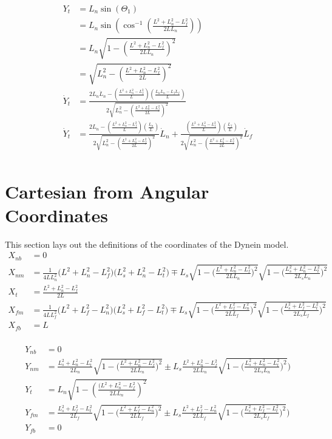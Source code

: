 \documentclass[11pt, landscape]{article}
\begin{document}
\begin{align}
  Y_{t} &= L_n\sin(\Theta_{1}) \\
  &= L_n\sin\left(\cos^{-1}\left(\frac{L^2+L_n^2-L_f^2}{2LL_n}\right)\right) \\
  &= L_n\sqrt{1 - \left(\frac{L^2+L_n^2-L_f^2}{2LL_n}\right)^2} \\
  &= \sqrt{L_n^2 - \left(\frac{L^2+L_n^2-L_f^2}{2L}\right)^2} \\
  \dot{Y}_t &= \frac{2L_n\dot{L}_n - \left(\frac{L^2+L_n^2-L_f^2}{L}\right)\left(\frac{L_n\dot{L}_n - L_f\dot{L}_f}{L}\right)}{2\sqrt{L_n^2 - \left(\frac{L^2+L_n^2-L_f^2}{2L}\right)^2}}\\
  \dot{Y}_t &= \frac{2L_n - \left(\frac{L^2+L_n^2-L_f^2}{L}\right)\left(\frac{L_n}{L}\right)}{2\sqrt{L_n^2 - \left(\frac{L^2+L_n^2-L_f^2}{2L}\right)^2}}\dot{L}_n +
  \frac{\left(\frac{L^2+L_n^2-L_f^2}{L}\right)\left(\frac{L_f}{L}\right)}{2\sqrt{L_n^2 - \left(\frac{L^2+L_n^2-L_f^2}{2L}\right)^2}}\dot{L}_f\\
\end{align}

\section{Cartesian from Angular Coordinates}
This section lays out the definitions of the coordinates of the Dynein model. \\
\begin{align}
  X_{nb} &= 0 \\
  X_{nm} &= \frac{1}{4LL_n^2}\Big(L^2+L_{n}^2-L_{f}^2\Big)\Big(L_{s}^2+L_{n}^2-L_{t}^2\Big) \mp L_s\sqrt{1-\bigg(\frac{L^2+L_{n}^2-L_{f}^2}{2LL_{n}}\bigg)^2}\sqrt{1-\bigg(\frac{L_{s}^2+L_{n}^2-L_{t}^2}{2L_{s}L_{n}}\bigg)^2}\\
  X_{t}  &= \frac{L^2+L_n^2-L_f^2}{2L} \\
  X_{fm} &= \frac{1}{4LL_f^2}\Big(L^2+L_f^2-L_n^2\Big)\Big(L_{s}^2+L_f^2-L_{t}^2\Big) \mp L_s\sqrt{1-\bigg(\frac{L^2+L_f^2-L_n^2}{2LL_f}\bigg)^2}\sqrt{1-\bigg(\frac{L_{s}^2+L_f^2-L_{t}^2}{2L_{s}L_f}\bigg)^2}\\
  X_{fb} &= L \\
\end{align}

\begin{align}
  Y_{nb} &= 0 \\
  Y_{nm} &= \frac{L_{s}^2+L_{n}^2-L_{t}^2}{2L_{n}}\sqrt{1-\bigg(\frac{L^2+L_{n}^2-L_{f}^2}{2LL_{n}}\bigg)^2} \pm L_s\frac{L^2+L_{n}^2-L_{f}^2}{2LL_{n}}\sqrt{1-\bigg(\frac{L_{s}^2+L_{n}^2-L_{t}^2}{2L_{s}L_{n}}\bigg)^2} \Bigg)\\
  Y_{t}  &= L_n\sqrt{1 - \left(\frac{(L^2+L_n^2-L_f^2}{2LL_n}\right)^2} \\
  Y_{fm} &= \frac{L_{s}^2+L_f^2-L_{t}^2}{2L_f}\sqrt{1-\bigg(\frac{L^2+L_f^2-L_n^2}{2LL_f}\bigg)^2} \pm L_s\frac{L^2+L_f^2-L_n^2}{2LL_f}\sqrt{1-\bigg(\frac{L_{s}^2+L_f^2-L_{t}^2}{2L_{s}L_f}\bigg)^2} \Bigg)\\
  Y_{fb} &= 0
\end{align}
\end{document}
